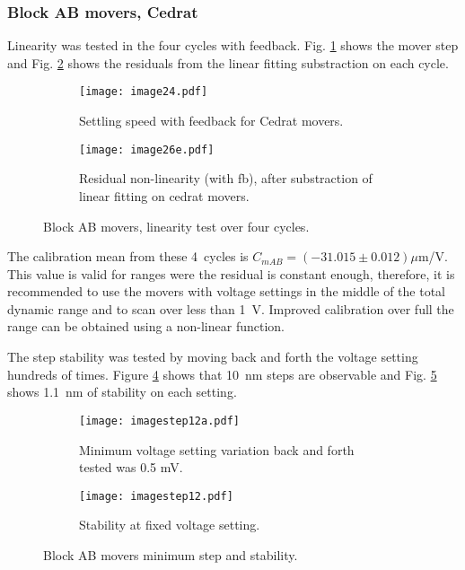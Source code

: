 \subsubsection{Block AB movers, Cedrat}
Linearity was tested in the four cycles with feedback. Fig. \ref{f:Cedratmsteps} shows the mover step and Fig. \ref{f:Cedratlinres} shows the residuals from the linear fitting substraction on each cycle.\par
\begin{figure}[!htb]
 \centering\hspace*{-0.6cm}
\begin{subfigure}{0.4\textwidth}
 \texttt{[image: image24.pdf]}\caption{Settling speed with feedback for Cedrat movers.}\label{f:Cedratmsteps}
\end{subfigure}\hspace*{1.5cm}
\begin{subfigure}{0.4\textwidth}
 \texttt{[image: image26e.pdf]}\caption{Residual non-linearity (with fb), after substraction of linear fitting on cedrat movers.}\label{f:Cedratlinres}
\end{subfigure}\caption{Block AB movers, linearity test over four cycles.}\label{f:Cedratfeedback}
\end{figure}
The calibration mean from these 4~cycles is $C_{mAB} = (-31.015\pm0.012)\mu$m/V. This value is valid for ranges were the residual is constant enough, therefore, it is recommended to use the movers with voltage settings in the middle of the total dynamic range and to scan over less than 1~V. Improved calibration over full the range can be obtained using a non-linear function.\par
The step stability was tested by moving back and forth the voltage setting hundreds of times. Figure \ref{f:Cedratstepstab} shows that 10~nm steps are observable and Fig. \ref{f:Cedratstab} shows 1.1~nm of stability on each setting.\par
\begin{figure}[!htb]
 \centering\hspace*{-0.6cm}
\begin{subfigure}{0.4\textwidth}
\texttt{[image: imagestep12a.pdf]}\caption{Minimum voltage setting variation back and forth tested was 0.5 mV.}\label{f:Cedratstepstab}
\end{subfigure}\hspace*{1.5cm}
\begin{subfigure}{0.4\textwidth}
 \texttt{[image: imagestep12.pdf]}\caption{Stability at fixed voltage setting.}\label{f:Cedratstab}
\end{subfigure}\caption{Block AB movers minimum step and stability.}\label{f:Cedratstability}
\end{figure}
